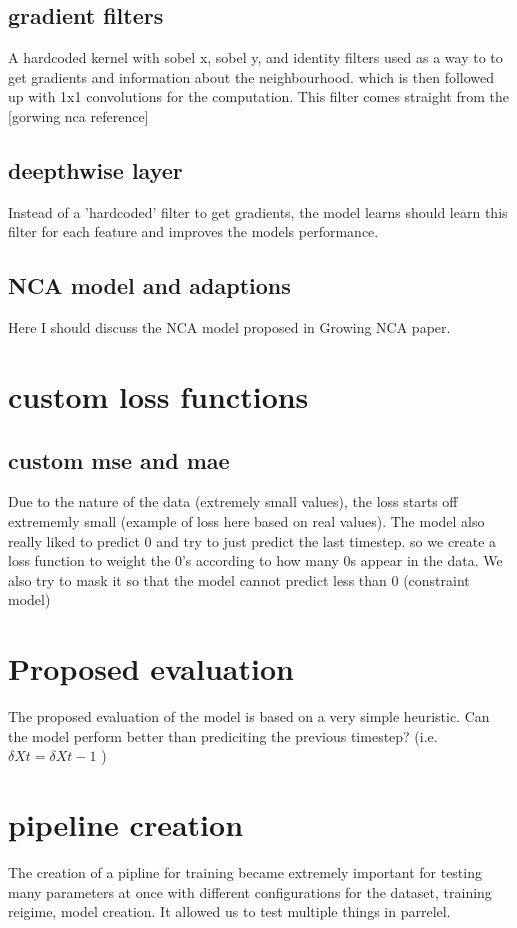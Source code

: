 \subsection{gradient filters}
A hardcoded kernel with sobel x, sobel y, and identity filters used as a way to to get gradients and information about the neighbourhood. which is then followed up with 1x1 convolutions for the computation. This filter comes straight from the [gorwing nca reference]
\subsection{deepthwise layer}
Instead of a 'hardcoded' filter to get gradients, the model learns should learn this filter for each feature and improves the models performance.


\subsection{NCA model and adaptions}
Here I should discuss the NCA model proposed in Growing NCA paper. 

\section{custom loss functions}
\subsection{custom mse and mae}
Due to the nature of the data (extremely small values), the loss starts off extrememly small (example of loss here based on real values). The model also really liked to predict 0 and try to just predict the last timestep. so we create a loss function to weight the 0's according to how many 0s appear in the data. We also try to mask it so that the model cannot predict less than 0 (constraint model)
\section{Proposed evaluation}
The proposed evaluation of the model is based on a very simple heuristic. Can the model perform better than prediciting the previous timestep? (i.e. $\delta{Xt} = \delta{Xt-1}$ )
\section{pipeline creation}
The creation of a pipline for training became extremely important for testing many parameters at once with different configurations for the dataset, training reigime, model creation. It allowed us to test multiple things in parrelel.